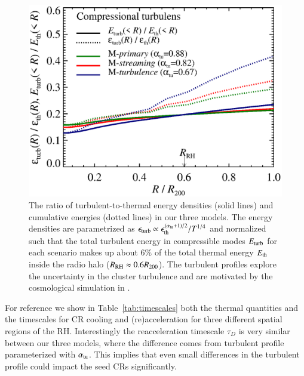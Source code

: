 \documentclass[a4paper,fleqn,usenatbib]{mnras}
\begin{document}
\begin{figure}
  \includegraphics[width=1.0\columnwidth]{turb_profile_ratio_tot.eps}
  \caption{The ratio of turbulent-to-thermal energy densities (solid
    lines) and cumulative energies (dotted lines) in our three
    models. The energy densities are parametrized as
    $\epsilon_{\mathrm{turb}} \propto
    \epsilon_{\mathrm{th}}^{(\alpha_{{\mathrm{tu}}}+1)/2}/T^{1/4}$ and
    normalized such that the total turbulent energy in compressible
    modes $E_{\mathrm{turb}}$ for each scenario makes up about 6\% of the
    total thermal energy $E_{\mathrm{th}}$ inside the radio halo
    ($R_{\mathrm{RH}}\approx0.6R_{200}$). The turbulent profiles explore
    the uncertainty in the cluster turbulence and are motivated by the
    cosmological simulation in
    \citep{2009ApJ...705.1129L,2010ApJ...725.1452S,2011A&A...529A..17V}.}
  \label{fig:Edens}
\end{figure}

For reference we show in Table~\ref{tab:timescales} both the thermal
quantities and the timescales for CR cooling and (re)acceleration for
three different spatial regions of the RH. Interestingly the
reacceleration timescale $\tau_D$ is very similar between our three
models, where the difference comes from turbulent profile
parameterized with $\alpha_{\mathrm{tu}}$. This implies that even small
differences in the turbulent profile could impact the seed CRs
significantly.
\end{document}
